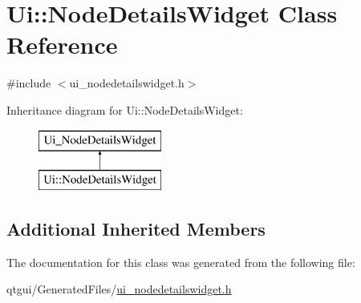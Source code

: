 \hypertarget{class_ui_1_1_node_details_widget}{}\section{Ui\+::Node\+Details\+Widget Class Reference}
\label{class_ui_1_1_node_details_widget}


{\ttfamily \#include $<$ui\+\_\+nodedetailswidget.\+h$>$}

Inheritance diagram for Ui\+::Node\+Details\+Widget\+:\begin{figure}[H]
\begin{center}
\leavevmode
\includegraphics[height=2.000000cm]{d3/da3/class_ui_1_1_node_details_widget}
\end{center}
\end{figure}
\subsection*{Additional Inherited Members}


The documentation for this class was generated from the following file\+:\begin{DoxyCompactItemize}
\item 
qtgui/\+Generated\+Files/\mbox{\hyperlink{ui__nodedetailswidget_8h}{ui\+\_\+nodedetailswidget.\+h}}\end{DoxyCompactItemize}
